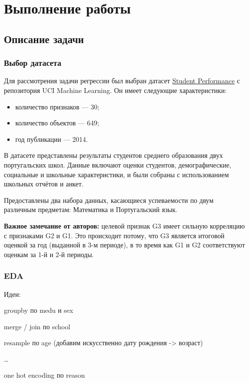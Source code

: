 \section{Выполнение работы}

\subsection{Описание задачи}

\subsubsection{Выбор датасета}

Для рассмотрения задачи регрессии был выбран датасет \href{https://archive.ics.uci.edu/dataset/320/student+performance}{Student Performance} с репозитория UCI Machine Learning. Он имеет следующие характеристики:
\begin{itemize}
    \item количество признаков --- 30;
    \item количество объектов --- 649;
    \item год публикации --- 2014.
\end{itemize}

В датасете представлены результаты студентов среднего образования двух португальских школ. Данные включают оценки студентов, демографические, социальные и школьные характеристики, и были собраны с использованием школьных отчётов и анкет.

Предоставлены два набора данных, касающиеся успеваемости по двум различным предметам: Математика и Португальский язык. 

\textbf{Важное замечание от авторов:} целевой признак G3 имеет сильную корреляцию с признаками G2 и G1. Это происходит потому, что G3 является итоговой оценкой за год (выданной в 3-м периоде), в то время как G1 и G2 соответствуют оценкам за 1-й и 2-й периоды.

\subsubsection{EDA}

Идеи:

groupby по medu и sex

merge / join по school

resample по age (добавим искусственно дату рождения -> возраст)

\dots

one hot encoding по reason

